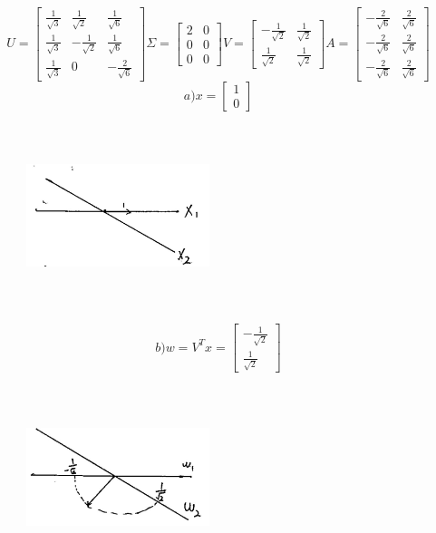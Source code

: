 \begin{example}
	$$U = 
	\left[
	\begin{matrix}
	\frac{1}{\sqrt{3}}&\frac{1}{\sqrt{2}} & \frac{1}{\sqrt{6}}\\
	\frac{1}{\sqrt{3}}&-\frac{1}{\sqrt{2}} & \frac{1}{\sqrt{6}}\\
	\frac{1}{\sqrt{3}}&0 & -\frac{2}{\sqrt{6}}
	\end{matrix}
	\right] \Sigma = 
	\left[
	\begin{matrix}
	2&0\\
	0&0\\
	0&0
	\end{matrix}
	\right] V = 
	\left[
	\begin{matrix}
	-\frac{1}{\sqrt{2}}&\frac{1}{\sqrt{2}}\\
	\frac{1}{\sqrt{2}}&\frac{1}{\sqrt{2}}
	\end{matrix}
	\right] A = 
	\left[
	\begin{matrix}
	-\frac{2}{\sqrt{6}}&\frac{2}{\sqrt{6}}\\
	-\frac{2}{\sqrt{6}}&\frac{2}{\sqrt{6}}\\
	-\frac{2}{\sqrt{6}}&\frac{2}{\sqrt{6}}
	\end{matrix}
	\right]
	$$
	$$ a) x = 
	\left[
	\begin{matrix}
	1\\
	0
	\end{matrix}
	\right]
	$$
	\begin{figure}
		\centering
		\includegraphics[width=2.1in,height=2.1in]{figures/ch05/figure1_a.jpg}
	\end{figure}
	$$ b) w = V^Tx = 
	\left[
	\begin{matrix}
	-\frac{1}{\sqrt{2}}\\
	\frac{1}{\sqrt{2}}
	\end{matrix}
	\right]
	$$
	\begin{figure}
		\centering
		\includegraphics[width=2.1in,height=2.1in]{figures/ch05/figure1_b.jpg}

\end{figure}
\end{example}

